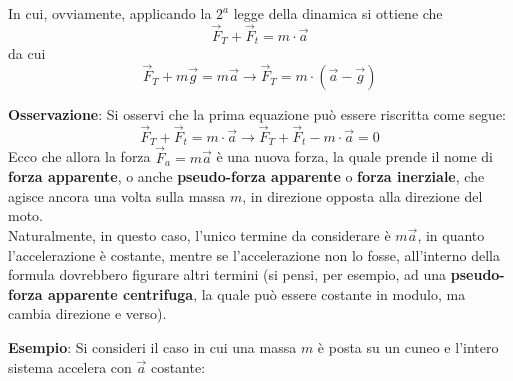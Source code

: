 \documentclass[a4paper]{extarticle}
\begin{document}
\noindent
In cui, ovviamente, applicando la $2^a$ legge della dinamica si ottiene che
\[\vec{F}_T + \vec{F}_t = m \cdot \vec{a}\]
da cui
\[\vec{F}_T + m \vec{g} = m \vec{a} \longrightarrow \vec{F}_T = m \cdot \left(\vec{a} - \vec{g}\right)\]

\vspace{1em}
\noindent
\textbf{Osservazione}: Si osservi che la prima equazione può essere riscritta come segue:
\[\vec{F}_T + \vec{F}_t = m \cdot \vec{a} \longrightarrow \vec{F}_T + \vec{F}_t - m \cdot \vec{a} = 0\]
Ecco che allora la forza $\vec{F}_a = m \vec{a}$ è una nuova forza, la quale prende il nome di \textbf{forza apparente}, o anche \textbf{pseudo-forza apparente} o \textbf{forza inerziale}, che agisce ancora una volta sulla massa $m$, in direzione opposta alla direzione del moto.\\
Naturalmente, in questo caso, l'unico termine da considerare è $m \vec{a}$, in quanto l'accelerazione è costante, mentre se l'accelerazione non lo fosse, all'interno della formula dovrebbero figurare altri termini (si pensi, per esempio, ad una \textbf{pseudo-forza apparente centrifuga}, la quale può essere costante in modulo, ma cambia direzione e verso).

\vspace{1em}
\noindent
\textbf{Esempio}: Si consideri il caso in cui una massa $m$ è posta su un cuneo e l'intero sistema accelera con $\vec{a}$ costante:
\end{document}
